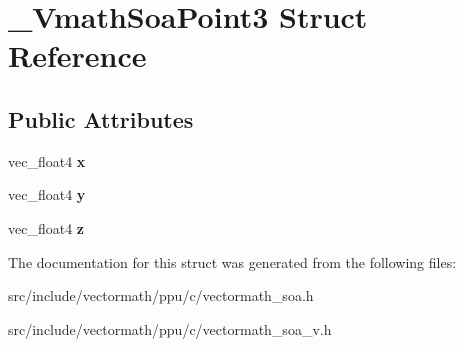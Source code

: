 \hypertarget{struct__VmathSoaPoint3}{\section{\-\_\-\-Vmath\-Soa\-Point3 Struct Reference}
\label{struct__VmathSoaPoint3}
}
\subsection*{Public Attributes}
\begin{DoxyCompactItemize}
\item 
\hypertarget{struct__VmathSoaPoint3_a6509eb3519d88fad0218c7c3a08dfa66}{vec\-\_\-float4 {\bfseries x}}\label{struct__VmathSoaPoint3_a6509eb3519d88fad0218c7c3a08dfa66}

\item 
\hypertarget{struct__VmathSoaPoint3_aae1a01365d039736edc4c14840b1bd00}{vec\-\_\-float4 {\bfseries y}}\label{struct__VmathSoaPoint3_aae1a01365d039736edc4c14840b1bd00}

\item 
\hypertarget{struct__VmathSoaPoint3_adbfc4dd8268a6556395942563d8277aa}{vec\-\_\-float4 {\bfseries z}}\label{struct__VmathSoaPoint3_adbfc4dd8268a6556395942563d8277aa}

\end{DoxyCompactItemize}


The documentation for this struct was generated from the following files\-:\begin{DoxyCompactItemize}
\item 
src/include/vectormath/ppu/c/vectormath\-\_\-soa.\-h\item 
src/include/vectormath/ppu/c/vectormath\-\_\-soa\-\_\-v.\-h\end{DoxyCompactItemize}
